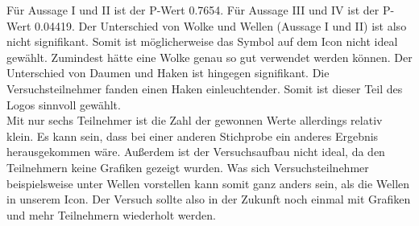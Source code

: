 \documentclass[a4paper,10pt]{article}
\begin{document}
Für Aussage I und II ist der P-Wert 0.7654. Für Aussage III und IV ist der P-Wert 0.04419. Der Unterschied von Wolke und Wellen (Aussage I und II) ist also nicht signifikant. Somit ist möglicherweise das Symbol auf dem Icon nicht ideal gewählt. Zumindest hätte eine Wolke genau so gut verwendet werden können. Der Unterschied von Daumen und Haken ist hingegen signifikant. Die Versuchsteilnehmer fanden einen Haken einleuchtender. Somit ist dieser Teil des Logos sinnvoll gewählt.\\

Mit nur sechs Teilnehmer ist die Zahl der gewonnen Werte allerdings relativ klein. Es kann sein, dass bei einer anderen Stichprobe ein anderes Ergebnis herausgekommen wäre. Außerdem ist der Versuchsaufbau nicht ideal, da den Teilnehmern keine Grafiken gezeigt wurden. Was sich Versuchsteilnehmer beispielsweise unter  Wellen vorstellen kann somit ganz anders sein, als die Wellen in unserem Icon. Der Versuch sollte also in der Zukunft noch einmal mit Grafiken und mehr Teilnehmern wiederholt werden.
\end{document}
